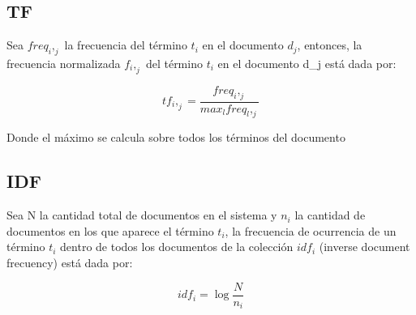 \documentclass{article}
\begin{document}
\subsection*{TF}
Sea $freq_i,_j$ la frecuencia del término $t_i$ en el documento $d_j$, entonces, la frecuencia normalizada $f_i,_j$ del término $t_i$ en el documento d_j está dada por: 

\begin{equation}
  tf_i,_j = \frac{freq_i,_j}{max_l freq_l,_j}
\end{equation}

Donde el máximo se calcula sobre todos los términos del documento

\subsection*{IDF}
Sea N la cantidad total de documentos en el sistema y $n_i$ la cantidad de documentos en los que aparece el término $t_i$, la frecuencia de ocurrencia de un término $t_i$ dentro de todos los documentos de la colección $idf_i$ (inverse document frecuency) está dada por:

\begin{equation}
idf_i = \log \frac{N}{n_i}
\end{equation} 
\end{document}
